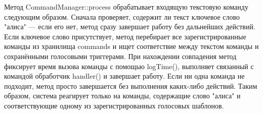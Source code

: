 Метод CommandManager::process обрабатывает входящую текстовую команду следующим образом. Сначала проверяет, содержит ли текст ключевое слово "алиса" — если его нет, метод сразу завершает работу без дальнейших действий. Если ключевое слово присутствует, метод перебирает все зарегистрированные команды из хранилища commands и ищет соответствие между текстом команды и сохранёнными голосовыми триггерами. При нахождении совпадения метод фиксирует время вызова команды с помощью logTime(), выполняет связанный с командой обработчик handler() и завершает работу. Если ни одна команда не подходит, метод просто завершается без выполнения каких-либо действий. Таким образом, система реагирует только на команды, содержащие слово "алиса" и соответствующие одному из зарегистрированных голосовых шаблонов.

\newpage
